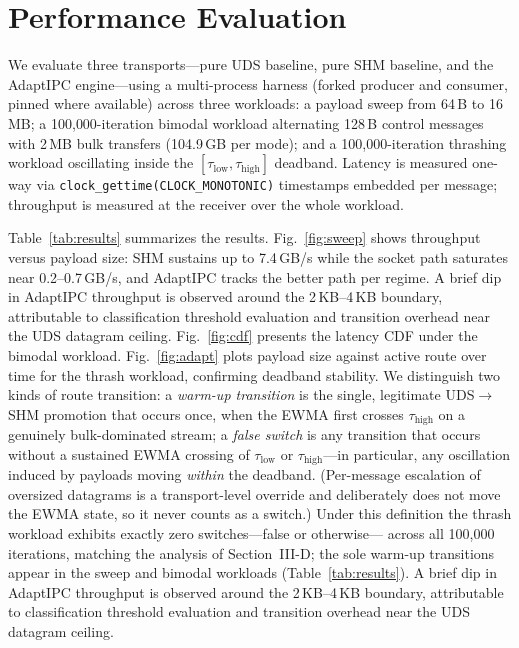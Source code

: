 \documentclass[conference]{IEEEtran}
\newcommand{\taulow}{\tau_{\mathrm{low}}}
\newcommand{\tauhigh}{\tau_{\mathrm{high}}}
\begin{document}
\section{Performance Evaluation}
We evaluate three transports---pure UDS baseline, pure SHM baseline, and the
AdaptIPC engine---using a multi-process harness (forked producer and consumer,
pinned where available) across three workloads: a payload sweep from 64\,B to
16\,MB; a 100{,}000-iteration bimodal workload alternating 128\,B control
messages with 2\,MB bulk transfers (104.9\,GB per mode); and a 100{,}000-iteration
thrashing workload oscillating inside the $[\taulow, \tauhigh]$ deadband.
Latency is measured one-way via \texttt{clock\_gettime(CLOCK\_MONOTONIC)}
timestamps embedded per message; throughput is measured at the receiver over
the whole workload.

Table~\ref{tab:results} summarizes the results. Fig.~\ref{fig:sweep} shows
throughput versus payload size: SHM sustains up to 7.4\,GB/s while the socket
path saturates near 0.2--0.7\,GB/s, and AdaptIPC tracks the better path per
regime. A brief dip in AdaptIPC throughput is observed around the 2\,KB--4\,KB
boundary, attributable to classification threshold evaluation and transition
overhead near the UDS datagram ceiling. Fig.~\ref{fig:cdf} presents the latency CDF under the bimodal
workload. Fig.~\ref{fig:adapt} plots payload size against active route over
time for the thrash workload, confirming deadband stability. We distinguish
two kinds of route transition: a \emph{warm-up transition} is the single,
legitimate UDS$\rightarrow$SHM promotion that occurs once, when the EWMA
first crosses $\tauhigh$ on a genuinely bulk-dominated stream; a
\emph{false switch} is any transition that occurs without a sustained EWMA
crossing of $\taulow$ or $\tauhigh$---in particular, any oscillation induced
by payloads moving \emph{within} the deadband. (Per-message escalation of
oversized datagrams is a transport-level override and deliberately does not
move the EWMA state, so it never counts as a switch.) Under this definition
the thrash workload exhibits exactly zero switches---false or otherwise---
across all 100{,}000 iterations, matching the analysis of Section~III-D;
the sole warm-up transitions appear in the sweep and bimodal workloads (Table~\ref{tab:results}). A brief dip in AdaptIPC throughput is observed around the 2\,KB--4\,KB boundary, attributable to classification threshold evaluation and transition overhead near the UDS datagram ceiling.
\end{document}
